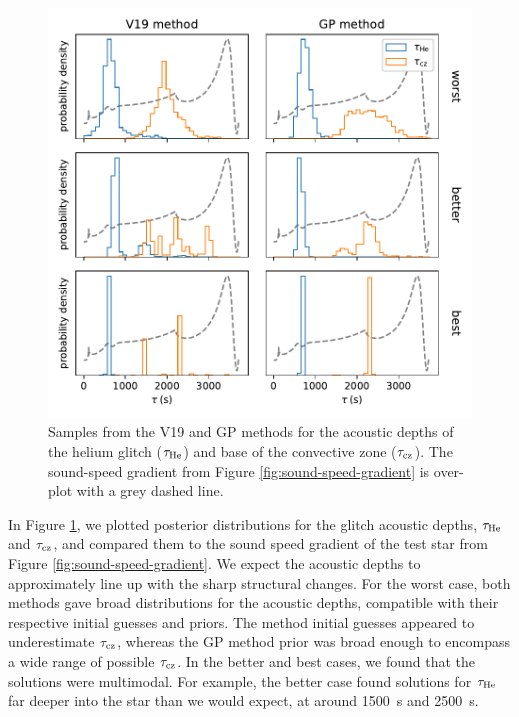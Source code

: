 \begin{figure}[!tb]
    \centering
    \includegraphics{figures/glitch-test-tau.pdf}
    \caption[Samples from the V19 and GP methods for the acoustic depths of the helium glitch (\(\tau_\helium\)) and base of the convective zone (\(\tau_\bcz\))]{Samples from the V19 and GP methods for the acoustic depths of the helium glitch (\(\tau_\helium\)) and base of the convective zone (\(\tau_\bcz\)). The sound-speed gradient from Figure \ref{fig:sound-speed-gradient} is over-plot with a grey dashed line.}
    \label{fig:glitch-test-tau}
\end{figure}

In Figure \ref{fig:glitch-test-tau}, we plotted posterior distributions for the glitch acoustic depths, \(\tau_\helium\) and \(\tau_\bcz\), and compared them to the sound speed gradient of the test star from Figure \ref{fig:sound-speed-gradient}. We expect the acoustic depths to approximately line up with the sharp structural changes. For the worst case, both methods gave broad distributions for the acoustic depths, compatible with their respective initial guesses and priors. The  method initial guesses appeared to underestimate \(\tau_\bcz\), whereas the GP method prior was broad enough to encompass a wide range of possible \(\tau_\bcz\). In the better and best cases, we found that the  solutions were multimodal. For example, the better case found solutions for \(\tau_\helium\) far deeper into the star than we would expect, at around \SI{1500}{\second} and \SI{2500}{\second}.

